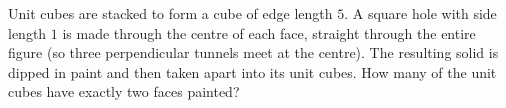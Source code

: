 Unit cubes are stacked to form a cube of edge length $5$. A square hole with side length $1$ is made through the centre of each face, straight through the entire figure (so three perpendicular tunnels meet at the centre). The resulting solid is dipped in paint and then taken apart into its unit cubes. How many of the unit cubes have exactly two faces painted?
